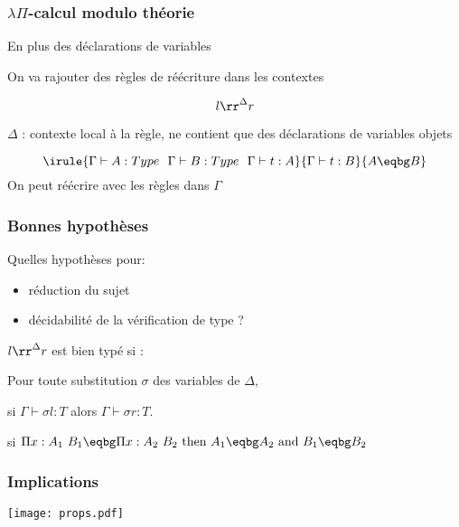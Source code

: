 \documentclass[12pt,aspectratio=169]{beamer}
\begin{document}

\begin{frame}
  \frametitle{$\lambda\Pi$-calcul modulo théorie}
  En plus des déclarations de variables

  On va rajouter des règles de réécriture dans les contextes

  $$l\rr^\Delta r$$
  
  $\Delta$ : contexte local à la règle, ne contient que des
  déclarations de variables objets
  \bigskip

  $$\irule{\Gamma \vdash A:Type~~\Gamma \vdash B:Type~~\Gamma \vdash t:A}
        {\Gamma \vdash t:B}
        {A \eqbg B}$$
On peut réécrire avec les règles dans $\Gamma$
\end{frame}

\begin{frame}
  \frametitle{Bonnes hypothèses}
  Quelles hypothèses pour:
  \begin{itemize}
  \item réduction du sujet
  \item décidabilité de la vérification de type ?
  \end{itemize}
  \bigskip

  \begin{definition}
    $l\rr^\Delta r$ est bien typé si :
    
    Pour toute substitution
    $\sigma$ des variables de $\Delta$,

    si $\Gamma\vdash \sigma l:T$ alors $\Gamma\vdash \sigma r:T$.
  \end{definition}

  \begin{definition}
    si $\Pi x:A_1~B_1 \eqbg \Pi x:A_2~B_2 \mbox{ then } A_1 \eqbg
A_2~\text{and}~B_1 \eqbg B_2$
  \end{definition}

\end{frame}

\begin{frame}
  \frametitle{Implications}
  \texttt{[image: props.pdf]}
\end{frame}
\end{document}
